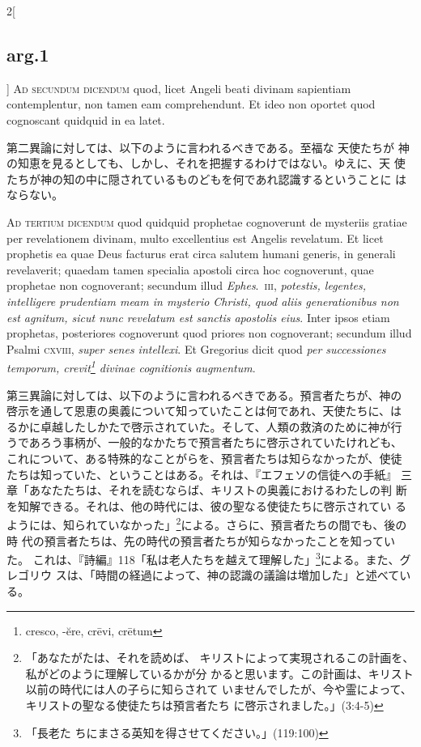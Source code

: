 \documentclass[paper=a4paper,fontsize=10pt,jafontsize=9pt,titlepage]{jlreq}
\begin{document}
\begin{paracol}{2}[\subsection{arg.1}]
{\scshape Ad secundum dicendum} quod, licet Angeli beati divinam
sapientiam contemplentur, non tamen eam comprehendunt. Et ideo non
oportet quod cognoscant quidquid in ea latet.

\switchcolumn

第二異論に対しては、以下のように言われるべきである。至福な 天使たちが
神の知恵を見るとしても、しかし、それを把握するわけではない。ゆえに、天
使たちが神の知の中に隠されているものどもを何であれ認識するということに
はならない。

\switchcolumn*[\subsection{ad.3}]

{\scshape Ad tertium dicendum} quod quidquid prophetae cognoverunt de
mysteriis gratiae per revelationem divinam, multo excellentius est
Angelis revelatum. Et licet prophetis ea quae Deus facturus erat circa
salutem humani generis, in generali revelaverit; quaedam tamen
specialia apostoli circa hoc cognoverunt, quae prophetae non
cognoverant; secundum illud {\itshape Ephes}.~{\scshape iii},
{\itshape potestis, legentes, intelligere prudentiam meam in mysterio
Christi, quod aliis generationibus non est agnitum, sicut nunc
revelatum est sanctis apostolis eius}. Inter ipsos etiam prophetas,
posteriores cognoverunt quod priores non cognoverant; secundum illud
Psalmi {\scshape cxviii}, {\itshape super senes intellexi}. Et
Gregorius dicit quod {\itshape per successiones temporum,
crevit\footnote{cresco, -\u{e}re, cr\={e}vi, cr\={e}tum} divinae
cognitionis augmentum}.

\switchcolumn

第三異論に対しては、以下のように言われるべきである。預言者たちが、神の
啓示を通して恩恵の奥義について知っていたことは何であれ、天使たちに、は
るかに卓越したしかたで啓示されていた。そして、人類の救済のために神が行
うであろう事柄が、一般的なかたちで預言者たちに啓示されていたけれども、
これについて、ある特殊的なことがらを、預言者たちは知らなかったが、使徒
たちは知っていた、ということはある。それは、『エフェソの信徒への手紙』
三章「あなたたちは、それを読むならば、キリストの奥義におけるわたしの判
断を知解できる。それは、他の時代には、彼の聖なる使徒たちに啓示されてい
るようには、知られていなかった」\footnote{「あなたがたは、それを読めば、
キリストによって実現されるこの計画を、私がどのように理解しているかが分
かると思います。この計画は、キリスト以前の時代には人の子らに知らされて
いませんでしたが、今や霊によって、キリストの聖なる使徒たちは預言者たち
に啓示されました。」(3:4-5)}による。さらに、預言者たちの間でも、後の時
代の預言者たちは、先の時代の預言者たちが知らなかったことを知っていた。
これは、『詩編』118「私は老人たちを越えて理解した」\footnote{「長老た
ちにまさる英知を得させてください。」(119:100)}による。また、グレゴリウ
スは、「時間の経過によって、神の認識の議論は増加した」と述べている。

\end{paracol}
\end{document}
